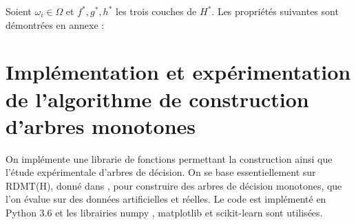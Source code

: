 \documentclass[a4paper]{article}
\begin{document}
Soient $\omega_i \in \Omega$ et $f^*, g^*, h^*$ les trois couches de $H^*$. Les propriétés suivantes sont
démontrées en annexe :


\section{Implémentation et expérimentation de l'algorithme de construction
d'arbres monotones} On implémente une librarie de fonctions permettant la
construction ainsi que l'étude expérimentale d'arbres de décision.  On se base
essentiellement sur RDMT(H), donné dans \cite{marsala-rank}, pour construire des
arbres de décision monotones, que l'on évalue sur des données artificielles et
réelles. Le code est implémenté en Python 3.6 et les librairies numpy
\cite{walt-numpy}, matplotlib \cite{hunter-matplotlib} et scikit-learn
\cite{scikit-learn} sont utilisées.
\end{document}
